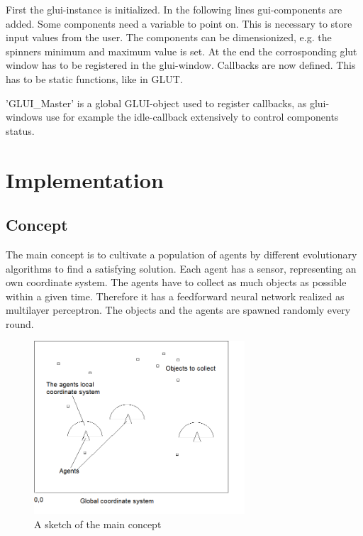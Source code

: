 \documentclass[10pt,a4paper,DIV=11]{scrreprt}
\begin{document}
First the glui-instance is initialized. In the following lines gui-components are added. Some components need a variable to point on. This is necessary to store input values from the user. The components can be dimensionized, e.g. the spinners minimum and maximum value is set.
At the end the corrosponding glut window has to be registered in the glui-window.
Callbacks are now defined. This has to be static functions, like in GLUT.

'GLUI\_Master' is a global GLUI-object used to register callbacks, as glui-windows use for example the idle-callback extensively to control components status.

\chapter{Implementation}

\section{Concept}
The main concept is to cultivate a population of agents by different evolutionary algorithms to find a satisfying solution. Each agent has a sensor, representing an own coordinate system. The agents have to collect as much objects as possible within a given time. Therefore it has a feedforward neural network realized as multilayer perceptron.
The objects and the agents are spawned randomly every round.

\begin{center}
	\begin{figure}[H]
		\centering
		\includegraphics[width=0.7\textwidth,scale=1.0]{files/main-concept.png}  
		\caption{A sketch of the main concept}
		\label{fig:concept-main}
	\end{figure}
\end{center}
\end{document}
